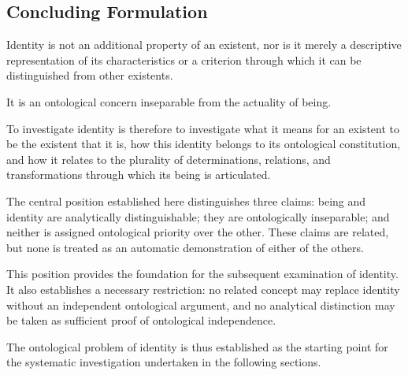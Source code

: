 \subsection{Concluding Formulation}

Identity is not an additional property of
an existent, nor is it merely a descriptive
representation of its characteristics or
a criterion through which it can be
distinguished from other existents.

It is an ontological concern inseparable
from the actuality of being.

To investigate identity is therefore to
investigate what it means for an existent
to be the existent that it is, how this
identity belongs to its ontological
constitution, and how it relates to the
plurality of determinations, relations,
and transformations through which its
being is articulated.

The central position established here
distinguishes three claims: being and
identity are analytically distinguishable;
they are ontologically inseparable; and
neither is assigned ontological priority
over the other. These claims are related,
but none is treated as an automatic
demonstration of either of the others.

This position provides the foundation
for the subsequent examination of identity.
It also establishes a necessary restriction:
no related concept may replace identity
without an independent ontological argument,
and no analytical distinction may be taken
as sufficient proof of ontological independence.

The ontological problem of identity is thus
established as the starting point for the
systematic investigation undertaken in
the following sections.


